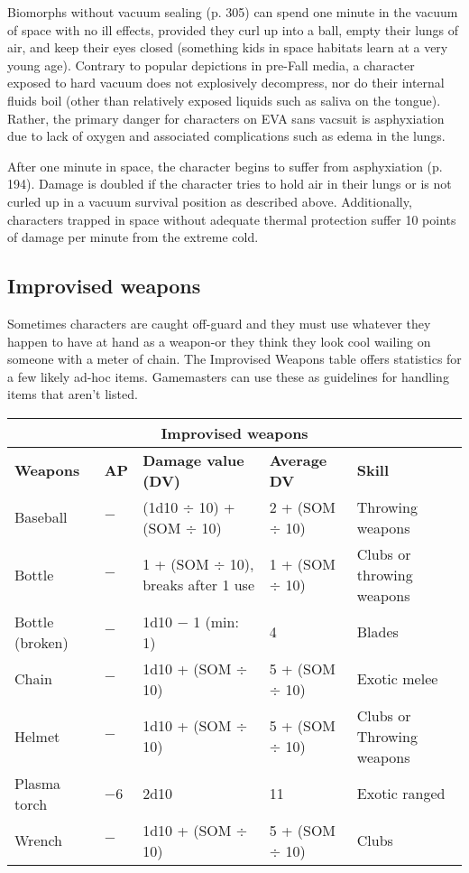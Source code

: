 Biomorphs without vacuum sealing (p. 305) can spend one minute in the vacuum of space with no ill effects, provided they curl up into a ball, empty their lungs of air, and keep their eyes closed (something kids in space habitats learn at a very young age). Contrary to popular depictions in pre-Fall media, a character exposed to hard vacuum does not explosively decompress, nor do their internal fluids boil (other than relatively exposed liquids such as saliva on the tongue). Rather, the primary danger for characters on EVA sans vacsuit is asphyxiation due to lack of oxygen and associated complications such as edema in the lungs.

After one minute in space, the character begins to suffer from asphyxiation (p. 194). Damage is doubled if the character tries to hold air in their lungs or is not curled up in a vacuum survival position as described above. Additionally, characters trapped in space without adequate thermal protection suffer 10 points of damage per minute from the extreme cold.

\subsection{Improvised weapons}
\label{sec:improvised-weapons}

Sometimes characters are caught off-guard and they must use whatever they happen to have at hand as a weapon-or they think they look cool wailing on someone with a meter of chain. The Improvised Weapons table offers statistics for a few likely ad-hoc items. Gamemasters can use these as guidelines for handling items that aren’t listed.

\begin{table}
\begin{tabularx}{\textwidth}{|l|l|l|l|X|}
\hline
\multicolumn{5}{|c|}{\textbf{Improvised weapons}} \\
\hline
\textbf{Weapons}	& \textbf{AP}	& \textbf{Damage value (DV)}				& \textbf{Average DV}	& \textbf{Skill}			\\
\hline
Baseball			& $-$		& (1d10 $\div$ 10) + (SOM $\div$ 10)		& 2 + (SOM $\div$ 10)	& Throwing weapons			\\
\hline
Bottle			& $-$		& 1 + (SOM $\div$ 10), breaks after 1 use	& 1 + (SOM $\div$ 10)	& Clubs or throwing weapons	\\
\hline
Bottle (broken)	& $-$		& 1d10 $-$ 1 (min: 1)						& 4					& Blades					\\
\hline
Chain			& $-$		& 1d10 + (SOM $\div$ 10)					& 5 + (SOM $\div$ 10)	& Exotic melee				\\
\hline
Helmet			& $-$		& 1d10 + (SOM $\div$ 10)					& 5 + (SOM $\div$ 10)	& Clubs or Throwing weapons	\\
\hline
Plasma torch		& $-$6		& 2d10								& 11					& Exotic ranged			\\
\hline
Wrench			& $-$ 		& 1d10 + (SOM $\div$ 10)					& 5 + (SOM $\div$ 10)	& Clubs					\\
\hline
\end{tabularx}
\label{tab:improvised-weapons}
\end{table}


